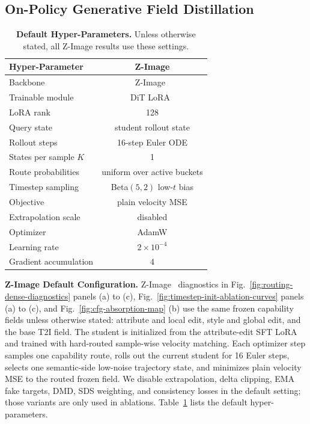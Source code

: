 \vspace{0.2cm}


\subsection{On-Policy Generative Field Distillation}
\label{sec:settings}


\begin{table}[t]
  \centering
  \setlength{\tabcolsep}{6pt}
  \caption{\textbf{Default Hyper-Parameters.} Unless otherwise stated, all Z-Image \name{} results use these settings.}
  \label{tab:settings}
  \vspace{-0.2cm}
  \begin{tabular}{lc}
    \toprule
    \textbf{Hyper-Parameter} & \textbf{Z-Image \name{}}\\
    \midrule
    Backbone & Z-Image~\cite{cai2025z}\\
    Trainable module & DiT LoRA~\cite{hu2022lora}\\
    LoRA rank & 128\\
    Query state & student rollout state\\
    Rollout steps & 16-step Euler ODE\\
    States per sample $K$ & 1\\
    Route probabilities & uniform over active buckets\\
    Timestep sampling & Beta$(5,2)$ low-$t$ bias\\
    Objective & plain velocity MSE\\
    Extrapolation scale & disabled\\
    Optimizer & AdamW\\
    Learning rate & $2\times10^{-4}$\\
    Gradient accumulation & 4\\
    \bottomrule
  \end{tabular}
\end{table}


\noindent\textbf{Z-Image \name{} Default Configuration.}
Z-Image~\cite{cai2025z} \name{} diagnostics in Fig.~\ref{fig:routing-dense-diagnostics} panels (a) to (c), Fig.~\ref{fig:timestep-init-ablation-curves} panels (a) to (c), and Fig.~\ref{fig:cfg-absorption-map} (b) use the same frozen capability fields unless otherwise stated: attribute and local edit, style and global edit, and the base T2I field. The student is initialized from the attribute-edit SFT LoRA and trained with hard-routed sample-wise velocity matching. Each optimizer step samples one capability route, rolls out the current student for 16 Euler steps, selects one semantic-side low-noise trajectory state, and minimizes plain velocity MSE to the routed frozen field. We disable extrapolation, delta clipping, EMA fake targets, DMD, SDS weighting, and consistency losses in the default setting; those variants are only used in ablations. Table~\ref{tab:settings} lists the default hyper-parameters.

